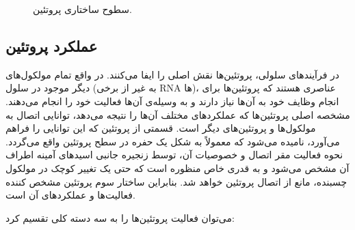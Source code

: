 \begin{figure}[h!]
\caption{
سطوح ساختاری پروتئین.
}
\label{fig:protein}
\end{figure}

\subsection{عملکرد پروتئین}
در فرآیندهای سلولی، پروتئین‌ها نقش اصلی را ایفا می‌کنند. در واقع تمام مولکول‌های دیگر موجود در سلول (به غیر از برخی RNA ها)، عناصری هستند که پروتئین‌ها برای انجام وظایف خود به ‌آن‌ها نیاز دارند و به وسیله‌ی آن‌ها فعالیت خود را انجام می‌دهند. مشخصه اصلی پروتئین‌ها که عملکرد‌های مختلف آن‌ها را نتیجه می‌دهد، توانایی اتصال به مولکول‌ها و پروتئین‌های دیگر است. قسمتی از پروتئین که این توانایی را فراهم می‌آورد،  نامیده می‌شود که معمولاً به شکل یک حفره در سطح پروتئین واقع می‌گردد. نحوه فعالیت مقر اتصال و خصوصیات آن، توسط زنجیره جانبی اسید‌های آمینه اطراف آن مشخص می‌شود و به قدری خاص منظوره است که حتی یک تغییر کوچک در مولکول چسبنده، مانع از اتصال پروتئین خواهد شد. بنابراین ساختار سوم پروتئین مشخص کننده فعالیت‌ها و عملکرد‌های آن است.

می‌توان فعالیت پروتئین‌ها را به سه دسته کلی تقسیم کرد:

